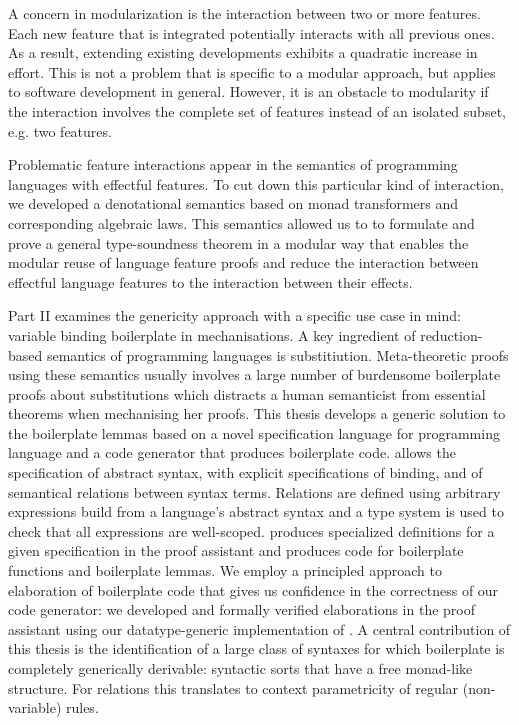 A concern in modularization is the interaction between two or more features.
Each new feature that is integrated potentially interacts with all previous
ones. As a result, extending existing developments exhibits a quadratic increase
in effort. This is not a problem that is specific to a modular approach, but
applies to software development in general. However, it is an obstacle to
modularity if the interaction involves the complete set of features instead of
an isolated subset, e.g. two features.

Problematic feature interactions appear in the semantics of programming
languages with effectful features. To cut down this particular kind of
interaction, we developed a denotational semantics based on monad transformers
and corresponding algebraic laws. This semantics allowed us to to formulate and
prove a general type-soundness theorem in a modular way that enables the modular
reuse of language feature proofs and reduce the interaction between effectful
language features to the interaction between their effects.

Part II examines the genericity approach with a specific use case in mind:
variable binding boilerplate in mechanisations. A key ingredient of
reduction-based semantics of programming languages is substitiution.
Meta-theoretic proofs using these semantics usually involves a large number of
burdensome boilerplate proofs about substitutions which distracts a human
semanticist from essential theorems when mechanising her proofs. This thesis
develops a generic solution to the boilerplate lemmas based on a novel
specification language \Knot for programming language and a code generator
\Needle that produces boilerplate code. \Knot allows the specification of
abstract syntax, with explicit specifications of binding, and of semantical
relations between syntax terms. Relations are defined using arbitrary
expressions build from a language's abstract syntax and a type system is used to
check that all expressions are well-scoped. \Needle produces specialized
definitions for a given \Knot specification in the \Coq proof assistant and
produces code for boilerplate functions and boilerplate lemmas. We employ a
principled approach to elaboration of boilerplate code that gives us confidence
in the correctness of our code generator: we developed and formally verified
elaborations in the \Coq proof assistant using our datatype-generic
implementation \Loom of \Knot. A central contribution of this thesis is the
identification of a large class of syntaxes for which boilerplate is completely
generically derivable: syntactic sorts that have a free monad-like structure.
For relations this translates to context parametricity of regular (non-variable)
rules.

